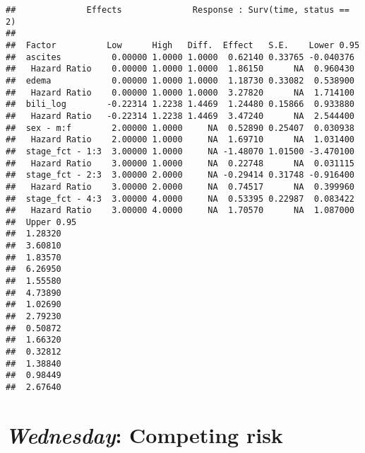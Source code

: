 \documentclass[]{book}
\newenvironment{Shaded}{\begin{snugshade}}{\end{snugshade}}
\newcommand{\KeywordTok}[1]{\textcolor[rgb]{0.13,0.29,0.53}{\textbf{{#1}}}}
\newcommand{\DataTypeTok}[1]{\textcolor[rgb]{0.13,0.29,0.53}{{#1}}}
\newcommand{\DecValTok}[1]{\textcolor[rgb]{0.00,0.00,0.81}{{#1}}}
\newcommand{\StringTok}[1]{\textcolor[rgb]{0.31,0.60,0.02}{{#1}}}
\newcommand{\CommentTok}[1]{\textcolor[rgb]{0.56,0.35,0.01}{\textit{{#1}}}}
\newcommand{\NormalTok}[1]{{#1}}
\theoremstyle{definition}
\theoremstyle{definition}
\theoremstyle{definition}
\theoremstyle{remark}
\begin{document}
\begin{Shaded}
\end{Shaded}

\begin{verbatim}
##              Effects              Response : Surv(time, status == 2) 
## 
##  Factor          Low      High   Diff.  Effect   S.E.    Lower 0.95
##  ascites          0.00000 1.0000 1.0000  0.62140 0.33765 -0.040376 
##   Hazard Ratio    0.00000 1.0000 1.0000  1.86150      NA  0.960430 
##  edema            0.00000 1.0000 1.0000  1.18730 0.33082  0.538900 
##   Hazard Ratio    0.00000 1.0000 1.0000  3.27820      NA  1.714100 
##  bili_log        -0.22314 1.2238 1.4469  1.24480 0.15866  0.933880 
##   Hazard Ratio   -0.22314 1.2238 1.4469  3.47240      NA  2.544400 
##  sex - m:f        2.00000 1.0000     NA  0.52890 0.25407  0.030938 
##   Hazard Ratio    2.00000 1.0000     NA  1.69710      NA  1.031400 
##  stage_fct - 1:3  3.00000 1.0000     NA -1.48070 1.01500 -3.470100 
##   Hazard Ratio    3.00000 1.0000     NA  0.22748      NA  0.031115 
##  stage_fct - 2:3  3.00000 2.0000     NA -0.29414 0.31748 -0.916400 
##   Hazard Ratio    3.00000 2.0000     NA  0.74517      NA  0.399960 
##  stage_fct - 4:3  3.00000 4.0000     NA  0.53395 0.22987  0.083422 
##   Hazard Ratio    3.00000 4.0000     NA  1.70570      NA  1.087000 
##  Upper 0.95
##  1.28320   
##  3.60810   
##  1.83570   
##  6.26950   
##  1.55580   
##  4.73890   
##  1.02690   
##  2.79230   
##  0.50872   
##  1.66320   
##  0.32812   
##  1.38840   
##  0.98449   
##  2.67640
\end{verbatim}

\chapter{\texorpdfstring{\emph{Wednesday}: Competing
risk}{Wednesday: Competing risk}}\label{competing-risk}
\end{document}
